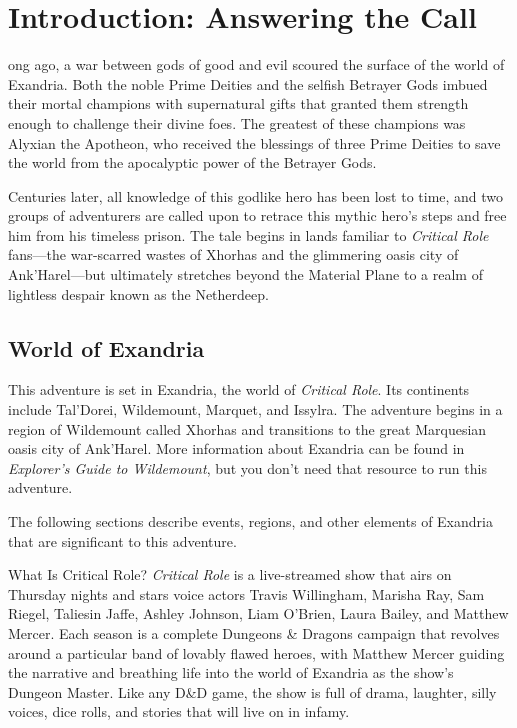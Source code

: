 \documentclass[10pt,a4paper,twoside,bg=print,twocolumn,openany,nodeprecatedcode]{dndbook}
\date{}
\begin{document}
\frontmatter
\tableofcontents
\mainmatter
{}
\chapter*{Introduction: Answering the Call}
ong ago, a war between gods of good and evil scoured the surface of the world of Exandria. Both the noble Prime Deities and the selfish Betrayer Gods imbued their mortal champions with supernatural gifts that granted them strength enough to challenge their divine foes. The greatest of these champions was Alyxian the Apotheon, who received the blessings of three Prime Deities to save the world from the apocalyptic power of the Betrayer Gods.


Centuries later, all knowledge of this godlike hero has been lost to time, and two groups of adventurers are called upon to retrace this mythic hero's steps and free him from his timeless prison. The tale begins in lands familiar to \textit{Critical Role} fans—the war-scarred wastes of Xhorhas and the glimmering oasis city of Ank'Harel—but ultimately stretches beyond the Material Plane to a realm of lightless despair known as the Netherdeep.

\section{World of Exandria}
This adventure is set in Exandria, the world of \textit{Critical Role}. Its continents include Tal'Dorei, Wildemount, Marquet, and Issylra. The adventure begins in a region of Wildemount called Xhorhas and transitions to the great Marquesian oasis city of Ank'Harel. More information about Exandria can be found in \textit{Explorer's Guide to Wildemount}, but you don't need that resource to run this adventure.

The following sections describe events, regions, and other elements of Exandria that are significant to this adventure.

\begin{DndSidebar}[float=!b]{What Is Critical Role?}
\textit{Critical Role} is a live-streamed show that airs on Thursday nights and stars voice actors Travis Willingham, Marisha Ray, Sam Riegel, Taliesin Jaffe, Ashley Johnson, Liam O'Brien, Laura Bailey, and Matthew Mercer. Each season is a complete Dungeons \& Dragons campaign that revolves around a particular band of lovably flawed heroes, with Matthew Mercer guiding the narrative and breathing life into the world of Exandria as the show's Dungeon Master. Like any D\&D game, the show is full of drama, laughter, silly voices, dice rolls, and stories that will live on in infamy.



\end{DndSidebar}
\end{document}
